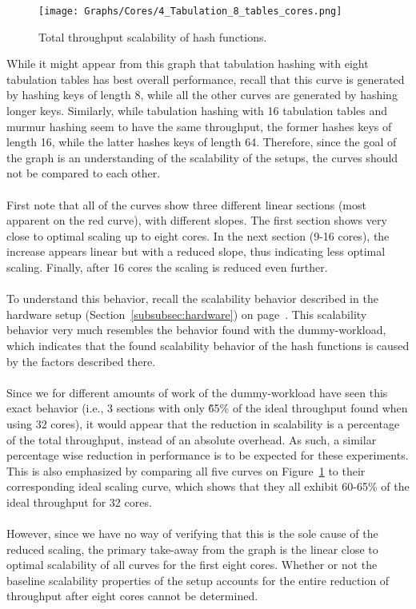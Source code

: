 \documentclass[11pt]{article} %
\begin{document}
\begin{figure}[H]
  \centering
  \texttt{[image: Graphs/Cores/4\_Tabulation\_8\_tables\_cores.png]}\\
  \caption{Total throughput scalability of hash functions.}
  \label{fig:tab_cores}
\end{figure}
\noindent
While it might appear from this graph that tabulation hashing with eight tabulation tables has best overall performance, recall that this curve is generated by hashing keys of length 8, while all the other curves are generated by hashing longer keys. Similarly, while tabulation hashing with 16 tabulation tables and murmur hashing seem to have the same throughput, the former hashes keys of length 16, while the latter hashes keys of length 64. Therefore, since the goal of the graph is an understanding of the scalability of the setups, the curves should not be compared to each other.\\
\\
First note that all of the curves show three different linear sections (most apparent on the red curve), with different slopes. The first section shows very close to optimal scaling up to eight cores. In the next section (9-16 cores), the increase appears linear but with a reduced slope, thus indicating less optimal scaling. Finally, after 16 cores the scaling is reduced even further. \\
\\
To understand this behavior, recall the scalability behavior described in the hardware setup (Section~\ref{subsubsec:hardware}) on page~\pageref{subsubsec:hardware}. This scalability behavior very much resembles the behavior found with the dummy-workload, which indicates that the found scalability behavior of the hash functions is caused by the factors described there. \\
\\
Since we for different amounts of work of the dummy-workload have seen this exact behavior (i.e., 3 sections with only \~65\% of the ideal throughput found when using 32 cores), it would appear that the reduction in scalability is a percentage of the total throughput, instead of an absolute overhead. As such, a similar percentage wise reduction in performance is to be expected for these experiments. This is also emphasized by  comparing all five curves on Figure~\ref{fig:tab_cores} to their corresponding ideal scaling curve, which shows that they all exhibit 60-65\% of the ideal throughput for 32 cores.\\
\\
However, since we have no way of verifying that this is the sole cause of the reduced scaling, the primary take-away from the graph is the linear close to optimal scalability of all curves for the first eight cores. Whether or not the baseline scalability properties of the setup accounts for the entire reduction of throughput after eight cores cannot be determined.
\end{document}
